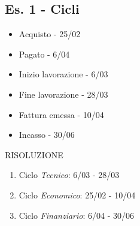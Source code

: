 \documentclass[a4paper,12pt]{report}
\begin{document}
\subsection{Es. 1 - Cicli}
\begin{itemize}
    \item Acquisto - 25/02
    \item Pagato - 6/04
    \item Inizio lavorazione - 6/03
    \item Fine lavorazione - 28/03
    \item Fattura emessa - 10/04
    \item Incasso - 30/06
\end{itemize}
RISOLUZIONE
\begin{enumerate}
    \item Ciclo \textit{Tecnico}: 6/03 - 28/03
    \item Ciclo \textit{Economico}: 25/02 - 10/04
    \item Ciclo \textit{Finanziario}: 6/04 - 30/06
\end{enumerate}
    
\end{document}
